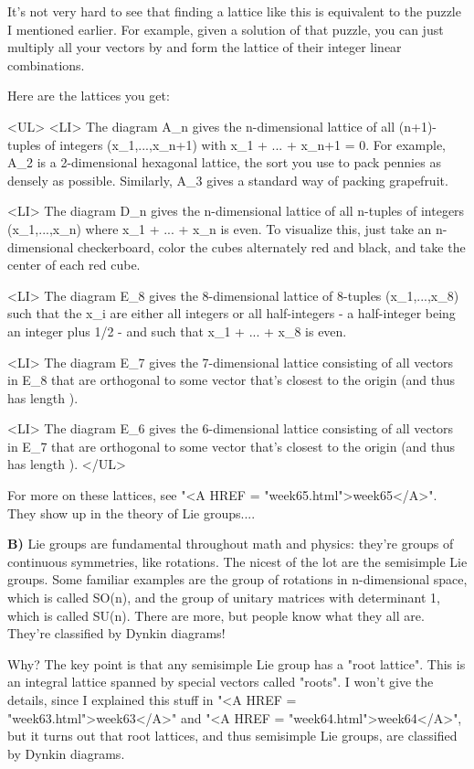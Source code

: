 It's not very hard to see that finding a lattice like this is equivalent 
to the puzzle I mentioned earlier.  For example, given a solution of 
that puzzle, you can just multiply all your vectors by  and
form the lattice of their integer linear combinations.  

Here are the lattices you get:

<UL>
<LI>
The diagram A_{n} gives the n-dimensional lattice 
of all (n+1)-tuples of integers (x_{1},...,x_{n+1}) with
x_{1} + ... + x_{n+1} = 0.
For example, A_{2} is a 2-dimensional hexagonal
lattice, the sort you use to pack pennies as densely as
possible.  Similarly, A_{3} gives a standard way of packing 
grapefruit.

<LI>
The diagram D_{n} gives the n-dimensional lattice
of all n-tuples of integers (x_{1},...,x_{n}) where
x_{1} + ... + x_{n} 
is even.
To visualize this, just take an n-dimensional checkerboard,
color the cubes alternately red and black, and take the center of
each red cube.  

<LI>
The diagram E_{8} gives the 8-dimensional lattice of
8-tuples (x_{1},...,x_{8}) such
that the x_{i} are either all integers or all half-integers - a
half-integer being an integer plus 1/2 - and such that
x_{1} + ... + x_{8} 
is even.

<LI>
The diagram E_{7} gives the 7-dimensional lattice consisting
of all vectors in E_{8} that are orthogonal to some vector
that's closest to the origin (and thus has length ).

<LI>
The diagram E_{6} gives the 6-dimensional lattice consisting
of all vectors in E_{7} that are orthogonal to some vector
that's closest to the origin (and thus has length ).
</UL>

For more on these lattices, see "<A HREF = "week65.html">week65</A>".
They show up in the theory of Lie groups....

\textbf{B)} Lie groups are fundamental throughout math and physics: they're
groups of continuous symmetries, like rotations.  The nicest of the
lot are the semisimple Lie groups.  Some familiar examples are the 
group of rotations in n-dimensional space, which is called SO(n), 
and the group of unitary matrices with determinant 1, which is 
called SU(n).  There are more, but people know what they all are.
They're classified by Dynkin diagrams!  

Why?  The key point is that any semisimple Lie group 
has a "root lattice".  
This is an integral lattice spanned by special vectors 
called "roots".  
I won't give the details, since I explained this 
stuff in "<A HREF = "week63.html">week63</A>" 
and "<A HREF = "week64.html">week64</A>", but it turns out 
that root lattices, and thus semisimple 
Lie groups, are classified by Dynkin diagrams.  


